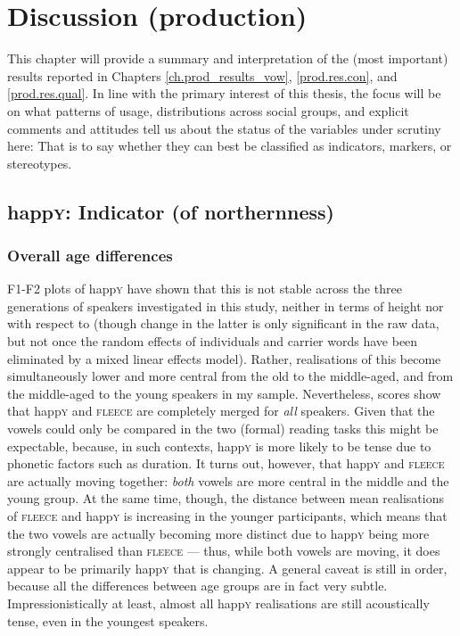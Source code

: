 \chapter{Discussion (production)}
\label{ch.prod_discussion}

This chapter will provide a summary and interpretation of the (most important) results reported in Chapters \ref{ch.prod_results_vow}, \ref{prod.res.con}, and \ref{prod.res.qual}.
In line with the primary interest of this thesis, the focus will be on what patterns of usage, distributions across social groups, and explicit comments and attitudes tell us about the status of the variables under scrutiny here: That is to say whether they can best be classified as indicators, markers, or stereotypes.

\section{happ\textrm{\textsc{y}}: Indicator (of northernness)}
\label{prod.disc.happy}

\subsection{Overall age differences}
\label{prod.disc.happy.age}

F1-F2 plots of happ\textsc{y} have shown that this  is not stable across the three generations of speakers investigated in this study, neither in terms of height nor with respect to  (though change in the latter is only significant in the raw data, but not once the random effects of individuals and carrier words have been eliminated by a mixed linear effects model).
Rather, realisations of this  become simultaneously lower and more central from the old to the middle-aged, and from the middle-aged to the young speakers in my sample.
Nevertheless,  scores show that happ\textsc{y} and \textsc{fleece} are completely merged for \emph{all} speakers.
Given that the vowels could only be compared in the two (formal) reading tasks this might be expectable, because, in such contexts, happ\textsc{y} is more likely to be tense due to phonetic factors such as duration.
It turns out, however, that happ\textsc{y} and \textsc{fleece} are actually moving together: \emph{both} vowels are more central in the middle and the young group.
At the same time, though, the distance between mean realisations of \textsc{fleece} and happ\textsc{y} is increasing in the younger participants, which means that the two vowels are actually becoming more distinct due to happ\textsc{y} being more strongly centralised than \textsc{fleece} --- thus, while both vowels are moving, it does appear to be primarily happ\textsc{y} that is changing.
A general caveat is still in order, because all the differences between age groups are in fact very subtle.
Impressionistically at least, almost all happ\textsc{y} realisations are still acoustically tense, even in the youngest speakers.

